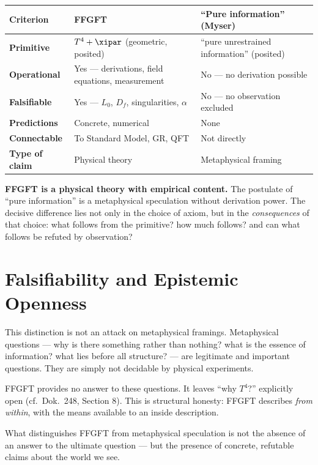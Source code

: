 \begin{longtable}{>{\bfseries}p{3.5cm} p{5cm} p{5cm}}
\toprule
Criterion & FFGFT & ``Pure information'' (Myser) \\
\midrule
Primitive & $T^4 + \xipar$ (geometric, posited) & ``pure unrestrained information'' (posited) \\
Operational & Yes --- derivations, field equations, measurement & No --- no derivation possible \\
Falsifiable & Yes --- $L_0$, $D_f$, singularities, $\alpha$ & No --- no observation excluded \\
Predictions & Concrete, numerical & None \\
Connectable & To Standard Model, GR, QFT & Not directly \\
Type of claim & Physical theory & Metaphysical framing \\
\bottomrule
\end{longtable}

\begin{erkenntnis}
\textbf{FFGFT is a physical theory with empirical content.} The postulate of ``pure information'' is a metaphysical speculation without derivation power. The decisive difference lies not only in the choice of axiom, but in the \emph{consequences} of that choice: what follows from the primitive? how much follows? and can what follows be refuted by observation?
\end{erkenntnis}

\section{Falsifiability and Epistemic Openness}

This distinction is not an attack on metaphysical framings. Metaphysical questions --- why is there something rather than nothing? what is the essence of information? what lies before all structure? --- are legitimate and important questions. They are simply not decidable by physical experiments.

FFGFT provides no answer to these questions. It leaves ``why $T^4$?'' explicitly open (cf.\ Dok.~248, Section 8). This is structural honesty: FFGFT describes \emph{from within}, with the means available to an inside description.

What distinguishes FFGFT from metaphysical speculation is not the absence of an answer to the ultimate question --- but the presence of concrete, refutable claims about the world we see.

